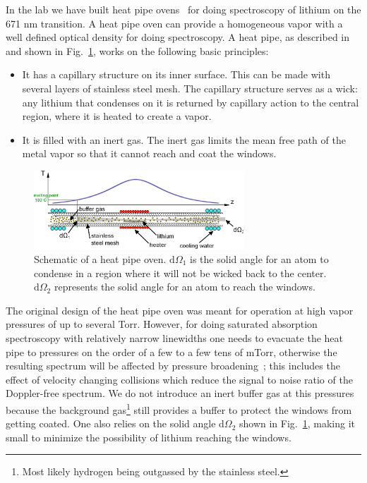 \documentclass[oneside,12pt]{memoir}
\begin{document}
In the lab we have built heat pipe ovens~\cite{HeatPipe1969} for doing
spectroscopy of lithium on the 671 nm transition.   A heat pipe oven can
provide a homogeneous vapor with a well defined optical density for doing
spectroscopy.  A heat pipe, as described in~\cite{HeatPipe1969,HeatPipe1971}
and shown in Fig.~\ref{fig:idealheatpipe}, works on the following basic
principles: \vspace{-0.5cm} \begin{itemize} \item  It has a capillary structure
on its inner surface.  This can be made with several layers of stainless steel
mesh.  The capillary structure serves as a wick: any lithium that condenses on
it is returned by capillary action to the central region, where it is heated to
create a vapor.  \item  It is filled with an inert gas.  The inert gas limits
the mean free path of the metal vapor so that it cannot reach and coat the
windows.  \end{itemize} \begin{figure} \centering
\includegraphics[width=0.7\textwidth]{../figures/323setup/heatpipe/idealheatpipe}
\caption[Schematic of a heat pipe oven]{\small Schematic of a heat pipe oven.
$\mathrm{d}\Omega_{1}$ is the solid angle for an atom to condense in a region
where it will not be wicked back to the center.  $\mathrm{d}\Omega_{2}$
represents the solid angle for an atom to reach the windows. }
\label{fig:idealheatpipe} \end{figure}

The original design of the heat pipe oven was meant for operation at high vapor
pressures of up to several Torr.  However, for doing saturated absorption
spectroscopy with relatively narrow linewidths one needs to evacuate the heat
pipe to pressures on the order of a few to a few tens of mTorr, otherwise the
resulting spectrum will be affected by pressure broadening~\cite{Olivares1998};
this includes the effect of velocity changing collisions which reduce the
signal to noise ratio of the Doppler-free spectrum.  We do not introduce  an
inert buffer gas at this pressures because the background gas\footnote{Most
likely hydrogen being outgassed by the stainless steel.} still provides a
buffer to protect the windows from getting coated. One also relies on the solid
angle $\mathrm{d}\Omega_{2}$ shown in Fig.~\ref{fig:idealheatpipe}, making it
small to minimize the possibility of lithium reaching the windows. 
\end{document}
